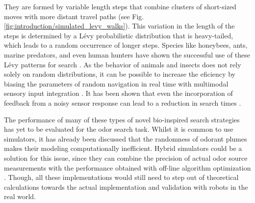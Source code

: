They are formed by variable length steps that combine clusters of short-sized moves with more distant travel paths (see Fig. \ref{fig:introduction/simulated_levy_walks}). This variation in the length of the steps is determined by a L\'{e}vy probabilistic distribution that is heavy-tailed, which leads to a random occurrence of longer steps.
Species like honeybees, ants, marine predators, and even human hunters have shown the successful use of these L\'{e}vy patterns for search \cite{Raichlen23122013}.
As the behavior of animals and insects does not rely solely on random distributions, it can be possible to increase the eficiency by biasing the parameters of random navigation in real time with multimodal sensory input integration \cite{arleo07}. It has been shown that even the incorporation of feedback from a noisy sensor response can lead to a reduction in search times \cite{Hein24072012, KongcunM09}.












The performance of many of these types of novel bio-inspired search strategies has yet to be evaluated for the odor search task. Whilst it is common to use simulators, it has already been discussed that the randomness of odorant plumes makes their modeling computationally inefficient. Hybrid simulators could be a solution for this issue, since they can combine the precision of actual odor source measurements with the performance obtained with off-line algorithm optimization \cite{HayesMG03}. Though, all these implementations would still need to step out of theoretical calculations towards the actual implementation and validation with robots in the real world.


